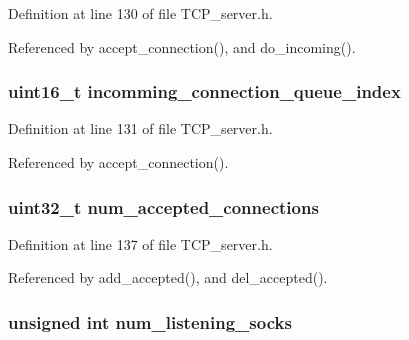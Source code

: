 Definition at line 130 of file T\+C\+P\+\_\+server.\+h.



Referenced by accept\+\_\+connection(), and do\+\_\+incoming().

\hypertarget{struct_t_c_p___server_a3365834b14a58220182399bdc98198f9}{
\subsubsection[{incomming\+\_\+connection\+\_\+queue\+\_\+index}]{\setlength{\rightskip}{0pt plus 5cm}uint16\+\_\+t incomming\+\_\+connection\+\_\+queue\+\_\+index}}\label{struct_t_c_p___server_a3365834b14a58220182399bdc98198f9}


Definition at line 131 of file T\+C\+P\+\_\+server.\+h.



Referenced by accept\+\_\+connection().

\hypertarget{struct_t_c_p___server_a77b20b49521cea9c12823bae50db6557}{
\subsubsection[{num\+\_\+accepted\+\_\+connections}]{\setlength{\rightskip}{0pt plus 5cm}uint32\+\_\+t num\+\_\+accepted\+\_\+connections}}\label{struct_t_c_p___server_a77b20b49521cea9c12823bae50db6557}


Definition at line 137 of file T\+C\+P\+\_\+server.\+h.



Referenced by add\+\_\+accepted(), and del\+\_\+accepted().

\hypertarget{struct_t_c_p___server_a5efc50bc21a4b488b17bb593b2758718}{
\subsubsection[{num\+\_\+listening\+\_\+socks}]{\setlength{\rightskip}{0pt plus 5cm}unsigned int num\+\_\+listening\+\_\+socks}}\label{struct_t_c_p___server_a5efc50bc21a4b488b17bb593b2758718}


